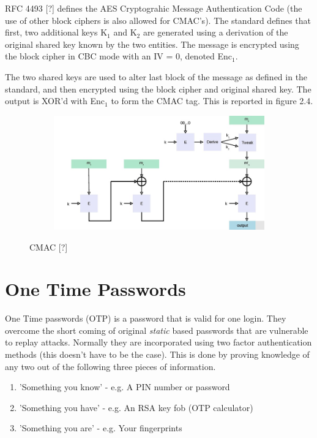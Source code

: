 \documentclass[bsc,frontabs,twoside,singlespacing,parskip,deptreport]{infthesis}     %
\begin{document}
RFC 4493 [?] defines the AES Cryptograhic Message Authentication Code (the use of other block ciphers is also allowed for CMAC's). The standard defines that first, two additional keys K$_1$ and K$_2$ are generated using a derivation of the original shared key known by the two entities. The message is encrypted using the block cipher in CBC mode with an IV = 0, denoted Enc$_1$. 

The two shared keys are used to alter last block of the message as defined in the standard, and then encrypted using the block cipher and original shared key. The output is XOR'd with Enc$_1$ to form the CMAC tag. This is reported in figure 2.4.


\begin{figure}[H]
\centering
\begin{subfigure}{1.2\textwidth}
  \includegraphics[width=1\linewidth]
  {images/crypto/CMAC.jpg}
\end{subfigure}
\caption{CMAC [?]}
\end{figure}


\section{One Time Passwords}
One Time passwords (OTP) is a password that is valid for one login. They overcome the short coming of original \textit{static} based passwords that are vulnerable to replay attacks. Normally they are incorporated using two factor authentication methods (this doesn't have to be the case). This is done by proving knowledge of any two out of the following three pieces of information.
\begin{enumerate}
\item 'Something you know' - e.g. A PIN number or password
\item 'Something you have' - e.g. An RSA key fob (OTP calculator)
\item 'Something you are'  - e.g. Your fingerprints
\end{enumerate}
\end{document}
